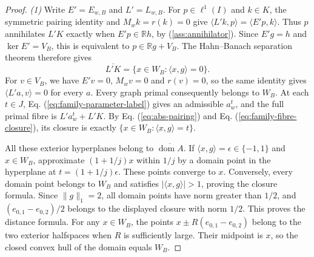 \documentclass[11pt]{article}
\newcommand{\R}{\mathbb R}
\newcommand{\dom}{\operatorname{dom}}
\newcommand{\pair}[2]{\langle #1,#2\rangle}
\theoremstyle{definition}
\theoremstyle{remark}
\begin{document}
\begin{proof}
\noindent\textit{(1)} Write $E'=E_{w,B}$ and $L'=L_{w,B}$. For $p\in\ell^1(I)$ and $k\in K$, the symmetric pairing identity and $M_wk=r(k)=0$ give $\pair{L'k}{p}=\pair{E'p}{k}$. Thus $p$ annihilates $L'K$ exactly when $E'p\in\R h$, by \textup{(\ref{ass:annihilator})}. Since $E'g=h$ and $\ker E'=V_B$, this is equivalent to $p\in\R g+V_B$. The Hahn--Banach separation theorem therefore gives
\begin{equation}
\overline{L'K}=\{x\in W_B:\pair{x}{g}=0\}.
\label{eq:family-fibre-closure}
\end{equation}
For $v\in V_B$, we have $E'v=0$, $M_wv=0$ and $r(v)=0$, so the same identity gives $\pair{L'a}{v}=0$ for every $a$. Every graph primal consequently belongs to $W_B$. At each $t\in J$, Eq. (\ref{eq:family-parameter-label}) gives an admissible $a_w^t$, and the full primal fibre is $L'a_w^t+L'K$. By Eq. (\ref{eq:abs-pairing}) and Eq. (\ref{eq:family-fibre-closure}), its closure is exactly $\{x\in W_B:\pair{x}{g}=t\}$.

All these exterior hyperplanes belong to $\overline{\dom A}$. If $\pair{x}{g}=\epsilon\in\{-1,1\}$ and $x\in W_B$, approximate $(1+1/j)x$ within $1/j$ by a domain point in the hyperplane at $t=(1+1/j)\epsilon$. These points converge to $x$. Conversely, every domain point belongs to $W_B$ and satisfies $|\pair{x}{g}|>1$, proving the closure formula. Since $\|g\|_1=2$, all domain points have norm greater than $1/2$, and $(e_{0,1}-e_{0,2})/2$ belongs to the displayed closure with norm $1/2$. This proves the distance formula. For any $x\in W_B$, the points $x\pm R(e_{0,1}-e_{0,2})$ belong to the two exterior halfspaces when $R$ is sufficiently large. Their midpoint is $x$, so the closed convex hull of the domain equals $W_B$.


\end{proof}
\end{document}
